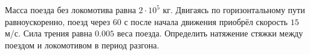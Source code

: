 Масса поезда без локомотива равна $2\cdot 10^5$ кг.
Двигаясь по горизонтальному пути равноускоренно,
поезд через $60$ с после начала движения приобрёл скорость $15$ м/с.
Сила трения равна $0.005$ веса поезда.
Определить натяжение стяжки между поездом и локомотивом в период разгона.

